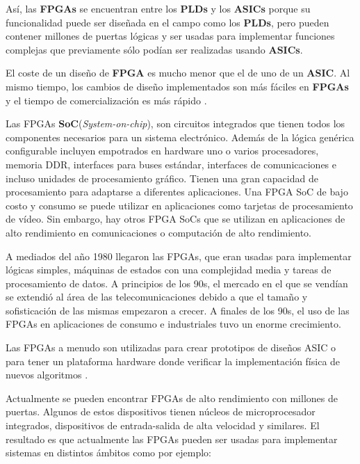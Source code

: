 Así, las \textbf{FPGAs} se encuentran entre los \textbf{PLDs} y los \textbf{ASICs} porque su funcionalidad puede ser diseñada en el campo como 
los \textbf{PLDs}, pero pueden contener millones de puertas lógicas y ser usadas para implementar funciones complejas que previamente sólo 
podían ser realizadas usando \textbf{ASICs}. 

El coste de un diseño de \textbf{FPGA} es mucho menor que el de uno de un \textbf{ASIC}. Al mismo tiempo, los cambios de diseño implementados 
son más fáciles en \textbf{FPGAs} y el tiempo de comercialización es más rápido \cite{maxfield2}.

Las FPGAs \textbf{SoC}(\textit{System-on-chip}), son circuitos integrados que tienen todos los componentes necesarios para un sistema electrónico.
Además de la lógica genérica configurable incluyen empotrados en hardware uno o varios procesadores, memoria DDR, interfaces para buses 
estándar, interfaces de comunicaciones e incluso unidades de procesamiento gráfico. Tienen una gran capacidad de procesamiento para 
adaptarse a diferentes aplicaciones. Una FPGA SoC de bajo costo y consumo se puede utilizar en aplicaciones como tarjetas de procesamiento de 
vídeo. Sin embargo, hay otros FPGA SoCs que se utilizan en aplicaciones de alto rendimiento en comunicaciones o computación de alto rendimiento.

A mediados del año 1980 llegaron las FPGAs, que eran usadas para implementar lógicas simples, máquinas de estados con una complejidad media 
y tareas de procesamiento de datos. A principios de los 90s, el mercado en el que se vendían se extendió al área de las telecomunicaciones 
debido a que el tamaño y sofisticación de las mismas empezaron a crecer. A finales de los 90s, el uso de las FPGAs en aplicaciones de consumo 
e industriales tuvo un enorme crecimiento.

Las FPGAs a menudo son utilizadas para crear prototipos de diseños ASIC o para tener un plataforma hardware donde verificar la implementación 
física de nuevos algoritmos \cite{maxfield1}. 

Actualmente se pueden encontrar FPGAs de alto rendimiento con millones de puertas. Algunos de estos dispositivos tienen núcleos de 
microprocesador integrados, dispositivos de entrada-salida de alta velocidad y similares. El resultado es que actualmente las FPGAs pueden ser 
usadas para implementar sistemas en distintos ámbitos como por ejemplo:

